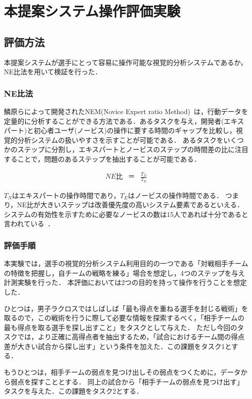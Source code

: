 \documentclass[sotsuron]{kuee}
\begin{document}
	\section{本提案システム操作評価実験}
		\subsection{評価方法}
			本提案システムが選手にとって容易に操作可能な視覚的分析システムであるか，NE比法を用いて検証を行った．
				\subsubsection{NE比法}
					鱗原らによって開発されたNEM(Novice Expert ratio Method)~\cite{NEM}は，行動データを定量的に分析することができる方法である．あるタスクを与え，開発者(エキスパート)と初心者ユーザ(ノービス)の操作に要する時間のギャップを比較し，視覚的分析システムの扱いやすさを示すことが可能である．
					あるタスクをいくつかのステップに分割し，エキスパートとノービスのステップの時間差の比に注目することで，問題のあるステップを抽出することが可能である．

					\begin{eqnarray}
						NE比 & ＝ & \frac{T_N}{T_E}
					\end{eqnarray}
					
					$T_N$はエキスパートの操作時間であり，$T_E$はノービスの操作時間である．
					つまり，NE比が大きいステップは改善優先度の高いシステム要素であるといえる．
					システムの有効性を示すために必要なノービスの数は15人であれば十分であると言われている~\cite{Nielsen}．
				\subsubsection{評価手順}
					本実験では，選手の視覚的分析システム利用目的の一つである「対戦相手チームの特徴を把握し，自チームの戦略を練る」場合を想定し，4つのステップを与え計測実験を行った．
					本評価においては2つの目的を持って操作を行うことを想定した．
					
					ひとつは，男子ラクロスではしばしば「最も得点を重ねる選手を封じる戦術」を取るので，この戦術を行うに際して必要な情報を探索するべく，「相手チームの最も得点を取る選手を探し出すこと」をタスクとして与えた．
					ただし今回のタスクでは，より正確に高得点者を抽出するため，「試合におけるチーム間の得点差が大きい試合から探し出す」という条件を加えた．この課題をタスク1とする．
					
					もうひとつは，相手チームの弱点を見つけ出しその弱点をつくために，データから弱点を探すこととする．
					同上の試合から「相手チームの弱点を見つけ出す」タスクを与えた．この課題をタスク2とする．
					
\end{document}
